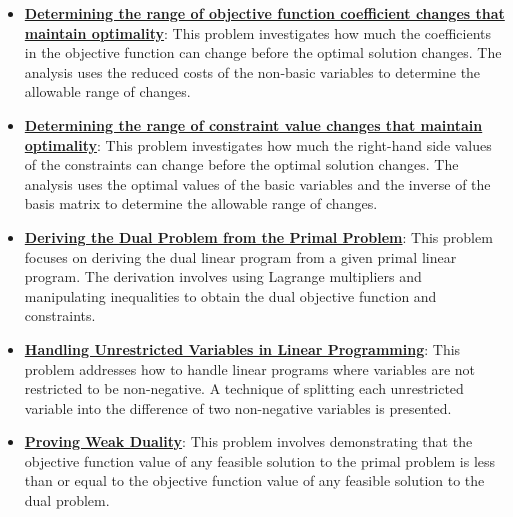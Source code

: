 \documentclass{article}%
\begin{document}
\begin{itemize}[leftmargin=*]%
\item \href{https://www.math.purdue.edu/~yipn/421/2024-09-26-Sensitivity.pdf#page=4}{\textbf{Determining the range of objective function coefficient changes that maintain optimality}}: This problem investigates how much the coefficients in the objective function can change before the optimal solution changes. The analysis uses the reduced costs of the non-basic variables to determine the allowable range of changes.%
\item \href{https://www.math.purdue.edu/~yipn/421/2024-09-26-Sensitivity.pdf#page=8}{\textbf{Determining the range of constraint value changes that maintain optimality}}: This problem investigates how much the right-hand side values of the constraints can change before the optimal solution changes. The analysis uses the optimal values of the basic variables and the inverse of the basis matrix to determine the allowable range of changes.%
\end{itemize}%
\begin{itemize}[leftmargin=*]%
\item \href{https://www.math.purdue.edu/~yipn/421/2024-10-01-DualGeneralLP.pdf#page=1}{\textbf{Deriving the Dual Problem from the Primal Problem}}: This problem focuses on deriving the dual linear program from a given primal linear program. The derivation involves using Lagrange multipliers and manipulating inequalities to obtain the dual objective function and constraints.%
\item \href{https://www.math.purdue.edu/~yipn/421/2024-10-01-DualGeneralLP.pdf#page=2}{\textbf{Handling Unrestricted Variables in Linear Programming}}: This problem addresses how to handle linear programs where variables are not restricted to be non-negative. A technique of splitting each unrestricted variable into the difference of two non-negative variables is presented.%
\item \href{https://www.math.purdue.edu/~yipn/421/2024-10-01-DualGeneralLP.pdf#page=5}{\textbf{Proving Weak Duality}}: This problem involves demonstrating that the objective function value of any feasible solution to the primal problem is less than or equal to the objective function value of any feasible solution to the dual problem.%
\end{itemize}%
\end{document}

